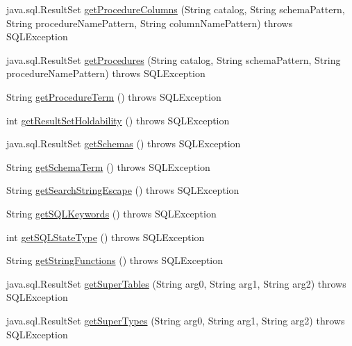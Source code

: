\begin{DoxyCompactItemize}
java.\+sql.\+Result\+Set \mbox{\hyperlink{classcom_1_1mysql_1_1jdbc_1_1_database_meta_data_ae2d34b7a6ae33efa59382465aaa01f58}{get\+Procedure\+Columns}} (String catalog, String schema\+Pattern, String procedure\+Name\+Pattern, String column\+Name\+Pattern)  throws S\+Q\+L\+Exception 
\item 
java.\+sql.\+Result\+Set \mbox{\hyperlink{classcom_1_1mysql_1_1jdbc_1_1_database_meta_data_a622efd6d2cc33569fba43123f4622843}{get\+Procedures}} (String catalog, String schema\+Pattern, String procedure\+Name\+Pattern)  throws S\+Q\+L\+Exception 
\item 
String \mbox{\hyperlink{classcom_1_1mysql_1_1jdbc_1_1_database_meta_data_aca2005227597c6c86de27eebaf80ffca}{get\+Procedure\+Term}} ()  throws S\+Q\+L\+Exception 
\item 
int \mbox{\hyperlink{classcom_1_1mysql_1_1jdbc_1_1_database_meta_data_abb8f80fc6c95a74165b26403c88049de}{get\+Result\+Set\+Holdability}} ()  throws S\+Q\+L\+Exception 
\item 
java.\+sql.\+Result\+Set \mbox{\hyperlink{classcom_1_1mysql_1_1jdbc_1_1_database_meta_data_ad26abb668beb0af16dd6e95b1dba0dac}{get\+Schemas}} ()  throws S\+Q\+L\+Exception 
\item 
String \mbox{\hyperlink{classcom_1_1mysql_1_1jdbc_1_1_database_meta_data_a3eaeb847fdebe1c01ccb377c99bb3142}{get\+Schema\+Term}} ()  throws S\+Q\+L\+Exception 
\item 
String \mbox{\hyperlink{classcom_1_1mysql_1_1jdbc_1_1_database_meta_data_a210b7942557a965c3af550074bb6fe9d}{get\+Search\+String\+Escape}} ()  throws S\+Q\+L\+Exception 
\item 
String \mbox{\hyperlink{classcom_1_1mysql_1_1jdbc_1_1_database_meta_data_a82422ad5a2de2030bbb696fe529b92ca}{get\+S\+Q\+L\+Keywords}} ()  throws S\+Q\+L\+Exception 
\item 
int \mbox{\hyperlink{classcom_1_1mysql_1_1jdbc_1_1_database_meta_data_a75eb814c9d9198a66e8ebf6b78002833}{get\+S\+Q\+L\+State\+Type}} ()  throws S\+Q\+L\+Exception 
\item 
String \mbox{\hyperlink{classcom_1_1mysql_1_1jdbc_1_1_database_meta_data_ab51ae5d381fa7217774f5426ec79793a}{get\+String\+Functions}} ()  throws S\+Q\+L\+Exception 
\item 
java.\+sql.\+Result\+Set \mbox{\hyperlink{classcom_1_1mysql_1_1jdbc_1_1_database_meta_data_a0292d35306f16ab85d756fc7f3c0a3c7}{get\+Super\+Tables}} (String arg0, String arg1, String arg2)  throws S\+Q\+L\+Exception 
\item 
java.\+sql.\+Result\+Set \mbox{\hyperlink{classcom_1_1mysql_1_1jdbc_1_1_database_meta_data_a44ea6c2a310bc34d7d679300eaca119d}{get\+Super\+Types}} (String arg0, String arg1, String arg2)  throws S\+Q\+L\+Exception 

\end{DoxyCompactItemize}
